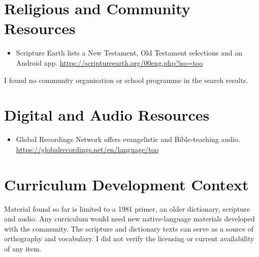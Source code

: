 \documentclass[12pt]{article}
\begin{document}
\section{Religious and Community Resources}
\begin{itemize}
\item Scripture Earth lists a New Testament, Old Testament selections and an Android app. \url{https://scriptureearth.org/00eng.php?iso=too}
\end{itemize}
I found no community organisation or school programme in the search results.

\section{Digital and Audio Resources}
\begin{itemize}
\item Global Recordings Network offers evangelistic and Bible-teaching audio. \url{https://globalrecordings.net/en/language/too}
\end{itemize}

\section{Curriculum Development Context}
Material found so far is limited to a 1981 primer, an older dictionary, scripture and audio. Any curriculum would need new native-language materials developed with the community. The scripture and dictionary texts can serve as a source of orthography and vocabulary. I did not verify the licensing or current availability of any item.
\end{document}
